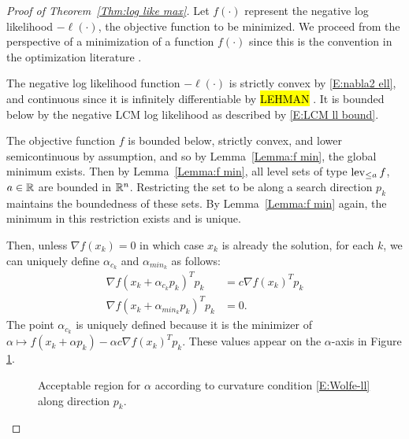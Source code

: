 \begin{proof}[Proof of Theorem~\ref{Thm:log like max}]
Let $f(\cdot)$ represent the negative log likelihood $- \ell(\cdot)$, the objective 
function to be minimized.  We proceed from the perspective of a minimization of a 
function $f(\cdot)$ since this is the convention in the optimization literature \citep
{NW,Rockafellar}.  %

The negative log likelihood function $-\ell(\cdot)$ is strictly convex by 
\eqref{E:nabla2 ell}, and continuous since it is infinitely differentiable by 
\hl{LEHMAN} \citep{TPE2}.
It is bounded below by the negative LCM log likelihood as described by \eqref{E:LCM ll bound}.

The objective function $f$ is bounded below, strictly convex, and lower semicontinuous 
by assumption, and so by Lemma~\ref{Lemma:f min}, the global minimum exists.  
Then by Lemma~\ref{Lemma:f min}, all level sets of type $\operatorname{lev}_{\leq a} f$, $a \in {\mathbb R}$ are bounded in ${\mathbb R}^n$.  Restricting the set to be along a search 
direction $p_k$ maintains the 
boundedness of these sets.  By Lemma~\ref{Lemma:f min} again, the minimum in this 
restriction exists and is unique.     

Then, unless $\nabla f( x_k ) = 0$ in which case $x_k$ is already the solution, for 
each $k$, we can uniquely define $
\alpha_{c_k}$ and $\alpha_{min_k}$ as follows: 
\begin{align}
	\nabla f( x_k + \alpha_{c_k} p_k)^T p_k &= c \nabla f(x_k)^T p_k \label{E:alphac} 
\\
	\nabla f( x_k + \alpha_{min_k} p_k)^T p_k &= 0. \label{E:alphamin} 
\end{align}
The point $\alpha_{c_k}$ is uniquely defined because it is the minimizer of $\alpha 
\mapsto f( x_k + \alpha p_k) - 
\alpha c \nabla f( x_k )^T p_k$.
These values appear on the $\alpha$-axis in Figure \ref{F:Wolfe-mod}.
\begin{figure}
\centering
\scalebox{.4}{}
\caption{Acceptable region for $\alpha$ according to curvature condition 
\eqref{E:Wolfe-ll} along direction $p_k$.}
\label{F:Wolfe-mod}
\end{figure}


\end{proof}

